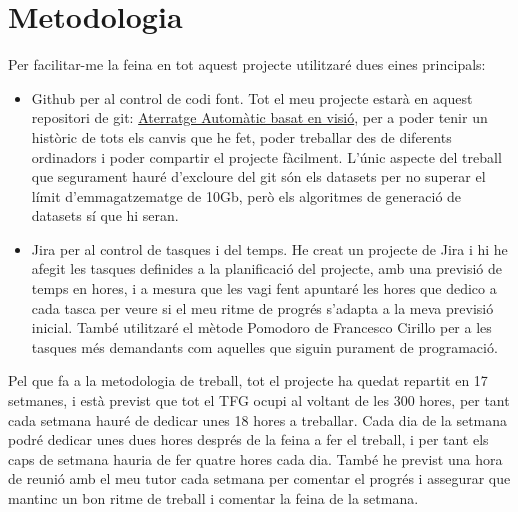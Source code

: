 \documentclass[10pt,a4paper,twocolumn,twoside]{article}
\begin{document}
\section{Metodologia}
Per facilitar-me la feina en tot aquest projecte utilitzaré dues eines principals:
\begin{itemize}
    \item{Github per al control de codi font. Tot el meu projecte estarà en aquest repositori de git:
    \href{https://github.com/NarcisNogue/Aterratge-automatic-d-avions-model-basat-en-visio}{Aterratge Automàtic basat en visió}, per a poder tenir un històric de tots els canvis que he fet, poder treballar des de diferents ordinadors i poder compartir el projecte fàcilment. L'únic aspecte del treball que segurament hauré d'excloure del git són els datasets per no superar el límit d'emmagatzematge de 10Gb, però els algoritmes de generació de datasets sí que hi seran.}
    
    \item{Jira per al control de tasques i del temps. He creat un projecte de Jira i hi he afegit les tasques definides a la planificació del projecte, amb una previsió de temps en hores, i a mesura que les vagi fent apuntaré les hores que dedico a cada tasca per veure si el meu ritme de progrés s'adapta a la meva previsió inicial. També utilitzaré el mètode Pomodoro \cite{Pomodoro} de Francesco Cirillo per a les tasques més demandants com aquelles que siguin purament de programació.}
\end{itemize}

Pel que fa a la metodologia de treball, tot el projecte ha quedat repartit en 17 setmanes, i està previst que tot el TFG ocupi al voltant de les 300 hores, per tant cada setmana hauré de dedicar unes 18 hores a treballar. Cada dia de la setmana podré dedicar unes dues hores després de la feina a fer el treball, i per tant els caps de setmana hauria de fer quatre hores cada dia. També he previst una hora de reunió amb el meu tutor cada setmana per comentar el progrés i assegurar que mantinc un bon ritme de treball i comentar la feina de la setmana.
\end{document}
